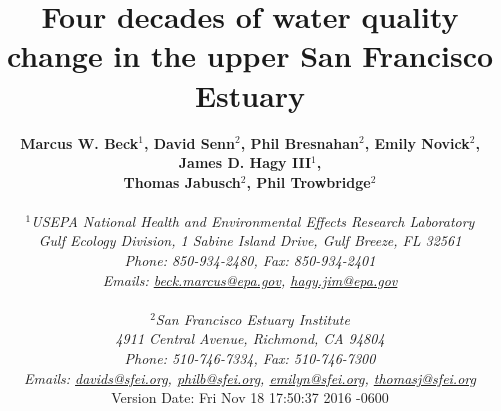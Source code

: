 \documentclass[letterpaper,12pt,oneside]{article}\usepackage[]{graphicx}\usepackage[]{color}
\begin{document}
\raggedbottom
\linenumbers
\raggedright
{}
\setlength{\parindent}{0.5in}
\renewcommand\refname{References \vspace{12pt}}

\begin{singlespace}
\title{{\bf {\Large Four decades of water quality change in the upper San Francisco Estuary}}}
\author{
  {\bf {\normalsize Marcus W. Beck$^1$, David Senn$^2$, Phil Bresnahan$^2$, Emily Novick$^2$, James D. Hagy III$^1$,}}
  \\{\bf {\normalsize Thomas Jabusch$^2$, Phil Trowbridge$^2$}}
  \\\\{\textit {\normalsize $^1$USEPA National Health and Environmental Effects Research Laboratory}}
  \\{\textit {\normalsize Gulf Ecology Division, 1 Sabine Island Drive, Gulf Breeze, FL 32561}}
	\\{\textit {\normalsize Phone: 850-934-2480, Fax: 850-934-2401}}
	\\{\textit {\normalsize Emails: \href{mailto:beck.marcus@epa.gov}{beck.marcus@epa.gov}, \href{mailto:hagy.jim@epa.gov}{hagy.jim@epa.gov}}}
  \\\\{\textit {\normalsize $^2$San Francisco Estuary Institute}}
	\\{\textit {\normalsize 4911 Central Avenue, Richmond, CA 94804}}
	\\{\textit {\normalsize Phone: 510-746-7334, Fax: 510-746-7300}}
	\\{\textit {\normalsize Emails: \href{mailto:davids@sfei.org}{davids@sfei.org}, \href{mailto:philb@sfei.org}{philb@sfei.org}, \href{mailto:emilyn@sfei.org}{emilyn@sfei.org}, \href{mailto:thomasj@sfei.org}{thomasj@sfei.org}}}
  \vspace{1in} 
  \\ Version Date:   Fri Nov 18 17:50:37 2016 -0600
	}
\date{}
\maketitle
\end{singlespace}
\clearpage
\end{document}
